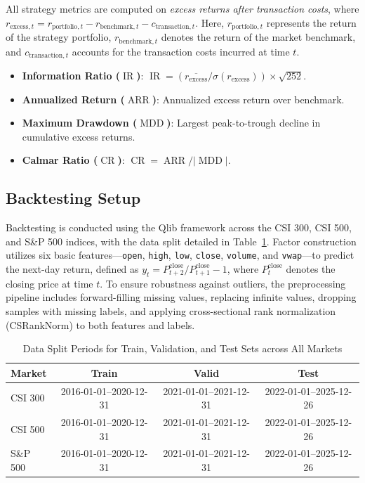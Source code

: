 All strategy metrics are computed on \textit{excess returns after transaction costs}, where $r_{\text{excess},t} = r_{\text{portfolio},t} - r_{\text{benchmark},t} - c_{\text{transaction},t}$. Here, $r_{\text{portfolio},t}$ represents the return of the strategy portfolio, $r_{\text{benchmark},t}$ denotes the return of the market benchmark, and $c_{\text{transaction},t}$ accounts for the transaction costs incurred at time $t$.

\begin{itemize}
    \setlength{\itemsep}{-2pt}
    \setlength{\parsep}{0pt}
    \setlength{\topsep}{0pt}
    \setlength{\partopsep}{0pt}
    \item \textbf{Information Ratio ($\operatorname{IR}$)}: $\operatorname{IR} = (\overline{r_{\text{excess}}} / \sigma(r_{\text{excess}})) \times \sqrt{252}$.
    \item \textbf{Annualized Return ($\operatorname{ARR}$)}: Annualized excess return over benchmark.
    \item \textbf{Maximum Drawdown ($\operatorname{MDD}$)}: Largest peak-to-trough decline in cumulative excess returns.
    \item \textbf{Calmar Ratio ($\operatorname{CR}$)}: $\operatorname{CR} = \operatorname{ARR} / |\operatorname{MDD}|$.
\end{itemize}

\subsection{Backtesting Setup}
\label{subsec:backtest_setup}

Backtesting is conducted using the Qlib framework across the CSI 300, CSI 500, and S\&P 500 indices, with the data split detailed in Table~\ref{tab:data_split}. Factor construction utilizes six basic features—\texttt{open}, \texttt{high}, \texttt{low}, \texttt{close}, \texttt{volume}, and \texttt{vwap}—to predict the next-day return, defined as $y_t = P_{t+2}^{\text{close}} / P_{t+1}^{\text{close}} - 1$, where $P_{t}^{\text{close}}$ denotes the closing price at time $t$. To ensure robustness against outliers, the preprocessing pipeline includes forward-filling missing values, replacing infinite values, dropping samples with missing labels, and applying cross-sectional rank normalization (CSRankNorm) to both features and labels.

\begin{table}[!htbp]
\centering
\caption{Data Split Periods for Train, Validation, and Test Sets across All Markets}
\label{tab:data_split}
\begin{tabular}{lccc}
\toprule
\textbf{Market} & \textbf{Train} & \textbf{Valid} & \textbf{Test} \\
\midrule
CSI 300 & 2016-01-01--2020-12-31 & 2021-01-01--2021-12-31 & 2022-01-01--2025-12-26 \\
CSI 500 & 2016-01-01--2020-12-31 & 2021-01-01--2021-12-31 & 2022-01-01--2025-12-26 \\
S\&P 500 & 2016-01-01--2020-12-31 & 2021-01-01--2021-12-31 & 2022-01-01--2025-12-26 \\
\bottomrule
\end{tabular}
\end{table}

